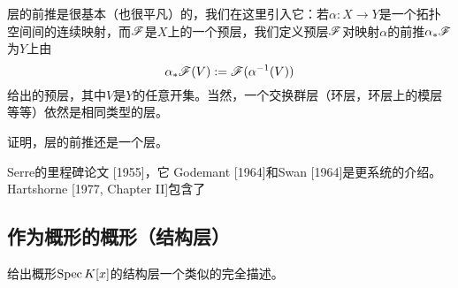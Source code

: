 层的前推是很基本（也很平凡）的，我们在这里引入它：若$\alpha:X\to Y$是一个拓扑空间间的连续映射，而$\mathscr{F}$是$X$上的一个预层，我们定义预层$\mathscr{F}$对映射$\alpha$的前推$\alpha_*\mathscr{F}$为$Y$上由
\[
	\alpha_*\mathscr{F}(V):=\mathscr{F}(\alpha^{-1}(V))
\]
给出的预层，其中$V$是$Y$的任意开集。当然，一个交换群层（环层，环层上的模层等等）依然是相同类型的层。

\begin{exe}
证明，层的前推还是一个层。
\end{exe}

 \label{ref:1}Serre的里程碑论文 [1955]，它 \nottran Godemant [1964]和Swan [1964]是更系统的介绍。Hartshorne [1977, Chapter II]包含了\nottran

\subsection{作为概形的概形（结构层）}


\begin{exe}
	给出概形$\operatorname{Spec} K[x]$的结构层一个类似的完全描述。
\end{exe}
